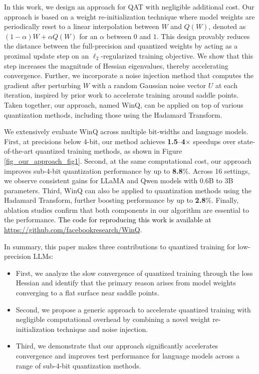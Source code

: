 \documentclass{article}
\theoremstyle{definition}
\newcommand{\revision}[1]{\textcolor{black}{#1}}
\newcommand{\acronym}{{\sc WinQ}}
\begin{document}
In this work, we design an approach for QAT with negligible additional cost. Our approach is based on a weight re-initialization technique where model weights are periodically reset to a linear interpolation between $W$ and $Q(W)$, denoted as $(1-\alpha)W + \alpha Q(W)$ for an $\alpha$ between $0$ and $1$. 
This design provably reduces the distance between the full-precision and quantized weights by acting as a proximal update step on an $\ell_2$-regularized training objective. We show that this step increases the magnitude of Hessian eigenvalues, thereby accelerating convergence.
Further, we incorporate a noise injection method that computes the gradient after perturbing $W$ with a random Gaussian noise vector $U$ at each iteration, inspired by prior work \citep{jin2017escape} to accelerate training around saddle points. Taken together, our approach, named \acronym{}, can be applied on top of various quantization methods, including those using the Hadamard Transform. 

We extensively evaluate \acronym{} across multiple bit-widths and language models. First, at precisions below 4-bit, our method achieves \textbf{1.5}–\textbf{4}$\times$ speedups over state-of-the-art quantized training methods, as shown in Figure \ref{fig_our_approach_fig1}. Second, at the same computational cost, our approach improves sub-4-bit quantization performance by up to \textbf{8.8}\%. Across 16 settings, we observe consistent gains for LLaMA and Qwen models with 0.6B to 3B parameters. Third, \acronym{} can also be applied to quantization methods using the Hadamard Transform, further boosting performance by up to \textbf{2.8}\%. Finally, ablation studies confirm that both components in our algorithm are essential to the performance. \revision{The code for reproducing this work is available at \href{https://github.com/facebookresearch/WinQ}{https://github.com/facebookresearch/WinQ}.} %

In summary, this paper makes three contributions to quantized training for low-precision LLMs:
\begin{itemize}[leftmargin=1.5em,itemsep=0pt, topsep=1pt,parsep=4.0pt]
    \item First, we analyze the slow convergence of quantized training through the loss Hessian and identify that the primary reason arises from model weights converging to a flat surface near saddle points. 
    \item Second, we propose a generic approach to accelerate quantized training with negligible computational overhead by combining a novel weight re-initialization technique and noise injection. 
    \item Third, we demonstrate that our approach significantly accelerates convergence and improves test performance for language models across a range of sub-4-bit quantization methods.
\end{itemize}
\end{document}
